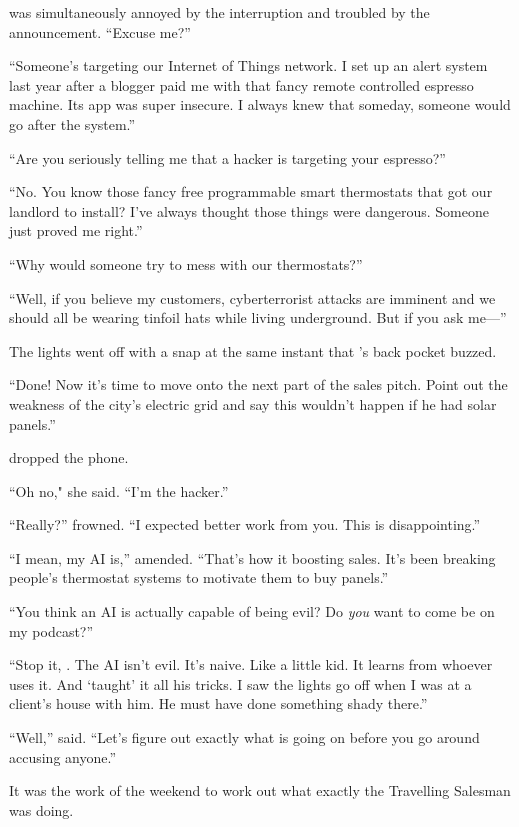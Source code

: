 {\protag} was simultaneously annoyed by the interruption and troubled by the announcement. ``Excuse me?''

``Someone’s targeting our Internet of Things network. I set up an alert system last year after a blogger paid me with that fancy remote controlled espresso machine. Its app was super insecure. I always knew that someday, someone would go after the system.''

``Are you seriously telling me that a hacker is targeting your espresso?''

``No. You know those fancy free programmable smart thermostats that \crunchyCity{} got our landlord to install? I've always thought those things were dangerous. Someone just proved me right.''

``Why would someone try to mess with our thermostats?''

``Well, if you believe my customers, cyberterrorist attacks are imminent and we should all be wearing tinfoil hats while living underground. But if you ask me---''

The lights went off with a snap at the same instant that {\protag}'s back pocket buzzed.

``Done! Now it's time to move onto the next part of the sales pitch. Point out the weakness of the city’s electric grid and say this wouldn't happen if he had solar panels.''

{\protag} dropped the phone.

``Oh no," she said. ``I’m the hacker.''

``Really?'' {\sidetag} frowned. ``I expected better work from you. This is disappointing.''

``I mean, my AI is,'' {\protag} amended. ``That’s how it boosting sales. It's been breaking people’s thermostat systems to motivate them to buy panels.''

``You think an AI is actually capable of being evil? Do \emph{you} want to come be on my podcast?''

``Stop it, {\sidetag}. The AI isn't evil. It's naive. Like a little kid. It learns from whoever uses it. And \energyJerk{} `taught' it all his tricks. I saw the lights go off when I was at a client's house with him. He must have done something shady there.''

``Well,” {\sidetag} said. ``Let's figure out exactly what is going on before you go around accusing anyone.''

It was the work of the weekend to work out what exactly the Travelling Salesman was doing.

